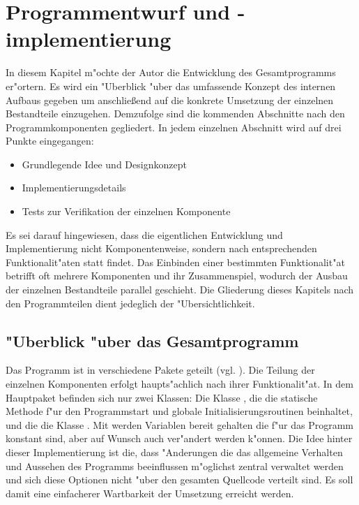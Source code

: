 \chapter{Programmentwurf und -implementierung}
\label{chap:entwurf}

In diesem Kapitel m"ochte der Autor die Entwicklung des Gesamtprogramms er"ortern.
Es wird ein "Uberblick "uber das umfassende Konzept des internen Aufbaus gegeben um anschlie\ss end auf die konkrete Umsetzung der einzelnen Bestandteile einzugehen.
Demzufolge sind die kommenden Abschnitte nach den Programmkomponenten gegliedert.
In jedem einzelnen Abschnitt wird auf drei Punkte eingegangen:
\begin{itemize}
	\item Grundlegende Idee und Designkonzept
	\item Implementierungsdetails
	\item Tests zur Verifikation der einzelnen Komponente
\end{itemize}
Es sei darauf hingewiesen, dass die eigentlichen Entwicklung und Implementierung nicht Komponentenweise, sondern nach entsprechenden Funktionalit"aten statt findet.
Das Einbinden einer bestimmten Funktionalit"at betrifft oft mehrere Komponenten und ihr Zusammenspiel, wodurch der Ausbau der einzelnen Bestandteile parallel geschieht.
Die Gliederung dieses Kapitels nach den Programmteilen dient jedeglich der "Ubersichtlichkeit.

\section{"Uberblick "uber das Gesamtprogramm}

Das Programm ist in verschiedene Pakete geteilt (vgl. ).
Die Teilung der einzelnen Komponenten erfolgt haupts"achlich nach ihrer Funktionalit"at.
In dem Hauptpaket  befinden sich nur zwei Klassen:
Die Klasse , die die statische Methode f"ur den Programmstart und globale Initialisierungsroutinen beinhaltet, und die die Klasse .
Mit  werden Variablen bereit gehalten die f"ur das Programm konstant sind, aber auf Wunsch auch ver"andert werden k"onnen.
Die Idee hinter dieser Implementierung ist die, dass "Anderungen die das allgemeine Verhalten und Aussehen des Programms beeinflussen m"oglichst zentral verwaltet werden und sich diese Optionen nicht "uber den gesamten Quellcode verteilt sind.
Es soll damit eine einfacherer Wartbarkeit der Umsetzung erreicht werden.

